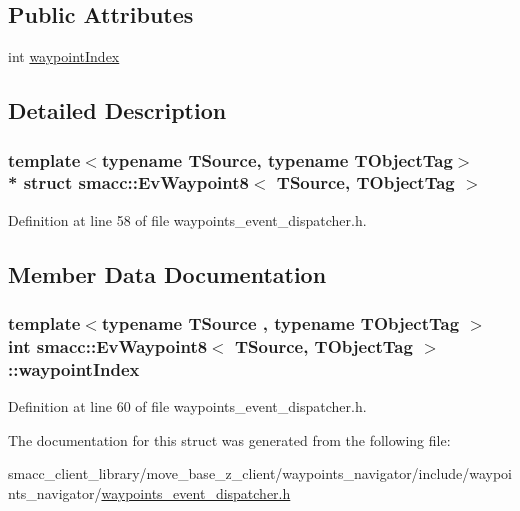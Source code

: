 \subsection*{Public Attributes}
\begin{DoxyCompactItemize}
\item 
int \hyperlink{structsmacc_1_1EvWaypoint8_aae5260ef1c210927d8d58db9337d8f11}{waypoint\+Index}
\end{DoxyCompactItemize}


\subsection{Detailed Description}
\subsubsection*{template$<$typename T\+Source, typename T\+Object\+Tag$>$\\*
struct smacc\+::\+Ev\+Waypoint8$<$ T\+Source, T\+Object\+Tag $>$}



Definition at line 58 of file waypoints\+\_\+event\+\_\+dispatcher.\+h.



\subsection{Member Data Documentation}
\subsubsection[{\texorpdfstring{waypoint\+Index}{waypointIndex}}]{\setlength{\rightskip}{0pt plus 5cm}template$<$typename T\+Source , typename T\+Object\+Tag $>$ int {\bf smacc\+::\+Ev\+Waypoint8}$<$ T\+Source, T\+Object\+Tag $>$\+::waypoint\+Index}\hypertarget{structsmacc_1_1EvWaypoint8_aae5260ef1c210927d8d58db9337d8f11}{}\label{structsmacc_1_1EvWaypoint8_aae5260ef1c210927d8d58db9337d8f11}


Definition at line 60 of file waypoints\+\_\+event\+\_\+dispatcher.\+h.



The documentation for this struct was generated from the following file\+:\begin{DoxyCompactItemize}
\item 
smacc\+\_\+client\+\_\+library/move\+\_\+base\+\_\+z\+\_\+client/waypoints\+\_\+navigator/include/waypoints\+\_\+navigator/\hyperlink{waypoints__event__dispatcher_8h}{waypoints\+\_\+event\+\_\+dispatcher.\+h}\end{DoxyCompactItemize}

